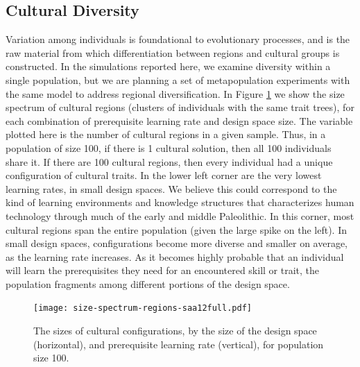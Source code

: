 \documentclass[graybox,natbib]{svmult}
\begin{document}
\subsection{Cultural Diversity}\label{cultural-diversity}

Variation among individuals is foundational to evolutionary processes,
and is the raw material from which differentiation between regions and
cultural groups is constructed. In the simulations reported here, we
examine diversity within a single population, but we are planning a set
of metapopulation experiments with the same model to address regional
diversification. In Figure \ref{img:size-spectrum-cultures-100} we show
the size spectrum of cultural regions (clusters of individuals with the
same trait trees), for each combination of prerequisite learning rate
and design space size. The variable plotted here is the number of
cultural regions in a given sample. Thus, in a population of size 100,
if there is 1 cultural solution, then all 100 individuals share it. If
there are 100 cultural regions, then every individual had a unique
configuration of cultural traits. In the lower left corner are the very
lowest learning rates, in small design spaces. We believe this could
correspond to the kind of learning environments and knowledge structures
that characterizes human technology through much of the early and middle
Paleolithic. In this corner, most cultural regions span the entire
population (given the large spike on the left). In small design spaces,
configurations become more diverse and smaller on average, as the
learning rate increases. As it becomes highly probable that an
individual will learn the prerequisites they need for an encountered
skill or trait, the population fragments among different portions of the
design space.

\begin{figure}[htbp] 
    \centering
    \texttt{[image: size-spectrum-regions-saa12full.pdf]}
    \caption{The sizes of cultural configurations, by the size of the design space (horizontal), and prerequisite learning rate (vertical), for population size 100.}
    \label{img:size-spectrum-cultures-100}
\end{figure}
\end{document}
